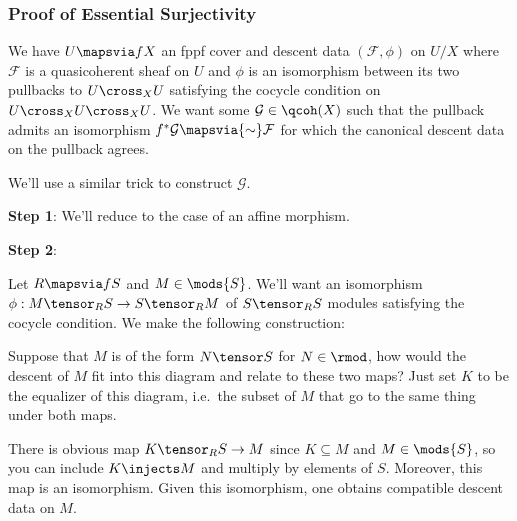 \hypertarget{proof-of-essential-surjectivity}{%
\subsubsection{Proof of Essential
Surjectivity}\label{proof-of-essential-surjectivity}}

We have \(U\mapsvia f X\) an fppf cover and descent data
\((\mathcal{F}, \phi)\) on \(U/X\) where \(\mathcal{F}\) is a
quasicoherent sheaf on \(U\) and \(\phi\) is an isomorphism between its
two pullbacks to \(U\cross_X U\) satisfying the cocycle condition on
\(U\cross_X U \cross_X U\). We want some \(\mathcal{G} \in \qcoh(X)\)
such that the pullback admits an isomorphism
\(f^* \mathcal{G} \mapsvia{\sim}\mathcal{F}\) for which the canonical
descent data on the pullback agrees.

We'll use a similar trick to construct \(\mathcal{G}\).

\begin{exercise}[Important]

\textbf{Step 1}: We'll reduce to the case of an affine morphism.

\end{exercise}

\textbf{Step 2}:

Let \(R\mapsvia f S\) and \(M\in \mods{S}\). We'll want an isomorphism
\(\phi: M\tensor_R S\to S\tensor_R M\) of \(S\tensor_R S\) modules
satisfying the cocycle condition. We make the following construction:

\begin{center}
\end{center}

Suppose that \(M\) is of the form \(N\tensor S\) for \(N\in \rmod\), how
would the descent of \(M\) fit into this diagram and relate to these two
maps? Just set \(K\) to be the equalizer of this diagram, i.e.~the
subset of \(M\) that go to the same thing under both maps.

\begin{claim}

There is obvious map \(K\tensor_R S\to M\) since \(K \subseteq M\) and
\(M\in \mods{S}\), so you can include \(K\injects M\) and multiply by
elements of \(S\). Moreover, this map is an isomorphism. Given this
isomorphism, one obtains compatible descent data on \(M\).

\end{claim}

